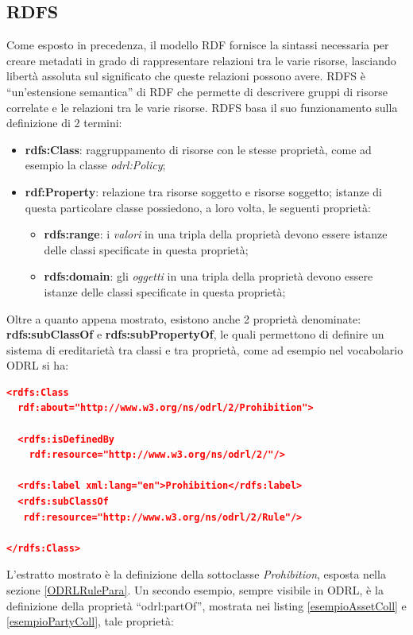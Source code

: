 \documentclass[12pt,a4paper,twoside]{book}
\begin{document}
\subsection{RDFS}
Come esposto in precedenza, il modello RDF fornisce la sintassi necessaria per creare metadati in grado di rappresentare relazioni tra le varie risorse, lasciando libertà assoluta sul significato che queste relazioni possono avere. RDFS è ``un'estensione semantica''\cite{RDFS} di RDF che permette di descrivere gruppi di risorse correlate e le relazioni tra le varie risorse. RDFS basa il suo funzionamento sulla definizione di 2 termini:
\begin{itemize}
\item \textbf{rdfs:Class}: raggruppamento di risorse con le stesse proprietà, come ad esempio la classe \textit{odrl:Policy};
\item \textbf{rdf:Property}: relazione tra risorse soggetto e risorse soggetto; istanze di questa particolare classe possiedono, a loro volta, le seguenti proprietà:
\begin{itemize}
\item \textbf{rdfs:range}: i \textit{valori} in una tripla della proprietà devono essere istanze delle classi specificate in questa proprietà;  
\item \textbf{rdfs:domain}: gli \textit{oggetti} in una tripla della proprietà devono essere istanze delle classi specificate in questa proprietà; 
\end{itemize}
\end{itemize}
Oltre a quanto appena mostrato, esistono anche 2 proprietà denominate: \textbf{rdfs:subClassOf} e \textbf{rdfs:subPropertyOf}, le quali permettono di definire un sistema di ereditarietà tra classi e tra proprietà, come ad esempio nel vocabolario ODRL si ha:\\
\begin{lstlisting}[language=json,firstnumber=1,caption={Estratto vocabolario ODRL\cite{ODRVocab}},captionpos=b,label=vocabExtract]
<rdfs:Class 
  rdf:about="http://www.w3.org/ns/odrl/2/Prohibition">
  
  <rdfs:isDefinedBy 
    rdf:resource="http://www.w3.org/ns/odrl/2/"/>
  
  <rdfs:label xml:lang="en">Prohibition</rdfs:label>
  <rdfs:subClassOf
   rdf:resource="http://www.w3.org/ns/odrl/2/Rule"/>
  
</rdfs:Class>
  \end{lstlisting}
L'estratto mostrato è la definizione della sottoclasse \textit{Prohibition}, esposta nella sezione \ref{ODRLRulePara}. Un secondo esempio, sempre visibile in ODRL, è la definizione della proprietà ``odrl:partOf'', mostrata nei listing \ref{esempioAssetColl} e \ref{esempioPartyColl}, tale proprietà:
\end{document}
